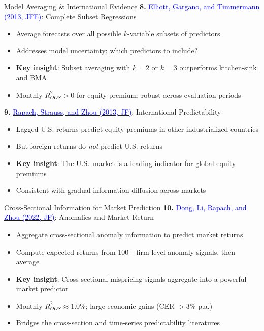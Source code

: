 \documentclass{beamer}
\begin{document}
\begin{frame}{Model Averaging \& International Evidence}
	\textbf{8.} \href{https://doi.org/10.1016/j.jeconom.2013.04.017}{\textcolor{blue}{Elliott, Gargano, and Timmermann (2013, JFE)}}: Complete Subset Regressions
	\begin{itemize}
		\item Average forecasts over all possible $k$-variable subsets of predictors
		\item Addresses model uncertainty: which predictors to include?
		\item \textbf{Key insight}: Subset averaging with $k=2$ or $k=3$ outperforms kitchen-sink and BMA
		\item Monthly $R^2_{OOS} > 0$ for equity premium; robust across evaluation periods
	\end{itemize}

	\vspace{8pt}
	\textbf{9.} \href{https://doi.org/10.1111/jofi.12041}{\textcolor{blue}{Rapach, Strauss, and Zhou (2013, JF)}}: International Predictability
	\begin{itemize}
		\item Lagged U.S. returns predict equity premiums in other industrialized countries
		\item But foreign returns do \textit{not} predict U.S. returns
		\item \textbf{Key insight}: The U.S.\ market is a leading indicator for global equity premiums
		\item Consistent with gradual information diffusion across markets
	\end{itemize}
\end{frame}

\begin{frame}{Cross-Sectional Information for Market Prediction}
	\textbf{10.} \href{https://doi.org/10.1111/jofi.13099}{\textcolor{blue}{Dong, Li, Rapach, and Zhou (2022, JF)}}: Anomalies and Market Return
	\begin{itemize}
		\item Aggregate cross-sectional anomaly information to predict market returns
		\item Compute expected returns from 100+ firm-level anomaly signals, then average
		\item \textbf{Key insight}: Cross-sectional mispricing signals aggregate into a powerful market predictor
		\item Monthly $R^2_{OOS} \approx 1.0\%$; large economic gains (CER $> 3\%$ p.a.)
		\item Bridges the cross-section and time-series predictability literatures
	\end{itemize}
\end{frame}
\end{document}
